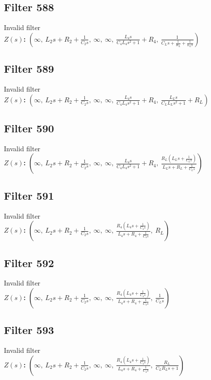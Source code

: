 \documentclass{article}
\begin{document}
\subsection*{Filter 588}
Invalid filter \\ 
\textbf{$Z(s)$:} $\left( \infty, \  L_{2} s + R_{2} + \frac{1}{C_{2} s}, \  \infty, \  \infty, \  \frac{L_{4} s}{C_{4} L_{4} s^{2} + 1} + R_{4}, \  \frac{1}{C_{L} s + \frac{1}{R_{L}} + \frac{1}{L_{L} s}}\right)$ \\ 
\subsection*{Filter 589}
Invalid filter \\ 
\textbf{$Z(s)$:} $\left( \infty, \  L_{2} s + R_{2} + \frac{1}{C_{2} s}, \  \infty, \  \infty, \  \frac{L_{4} s}{C_{4} L_{4} s^{2} + 1} + R_{4}, \  \frac{L_{L} s}{C_{L} L_{L} s^{2} + 1} + R_{L}\right)$ \\ 
\subsection*{Filter 590}
Invalid filter \\ 
\textbf{$Z(s)$:} $\left( \infty, \  L_{2} s + R_{2} + \frac{1}{C_{2} s}, \  \infty, \  \infty, \  \frac{L_{4} s}{C_{4} L_{4} s^{2} + 1} + R_{4}, \  \frac{R_{L} \left(L_{L} s + \frac{1}{C_{L} s}\right)}{L_{L} s + R_{L} + \frac{1}{C_{L} s}}\right)$ \\ 
\subsection*{Filter 591}
Invalid filter \\ 
\textbf{$Z(s)$:} $\left( \infty, \  L_{2} s + R_{2} + \frac{1}{C_{2} s}, \  \infty, \  \infty, \  \frac{R_{4} \left(L_{4} s + \frac{1}{C_{4} s}\right)}{L_{4} s + R_{4} + \frac{1}{C_{4} s}}, \  R_{L}\right)$ \\ 
\subsection*{Filter 592}
Invalid filter \\ 
\textbf{$Z(s)$:} $\left( \infty, \  L_{2} s + R_{2} + \frac{1}{C_{2} s}, \  \infty, \  \infty, \  \frac{R_{4} \left(L_{4} s + \frac{1}{C_{4} s}\right)}{L_{4} s + R_{4} + \frac{1}{C_{4} s}}, \  \frac{1}{C_{L} s}\right)$ \\ 
\subsection*{Filter 593}
Invalid filter \\ 
\textbf{$Z(s)$:} $\left( \infty, \  L_{2} s + R_{2} + \frac{1}{C_{2} s}, \  \infty, \  \infty, \  \frac{R_{4} \left(L_{4} s + \frac{1}{C_{4} s}\right)}{L_{4} s + R_{4} + \frac{1}{C_{4} s}}, \  \frac{R_{L}}{C_{L} R_{L} s + 1}\right)$ \\ 
\end{document}
